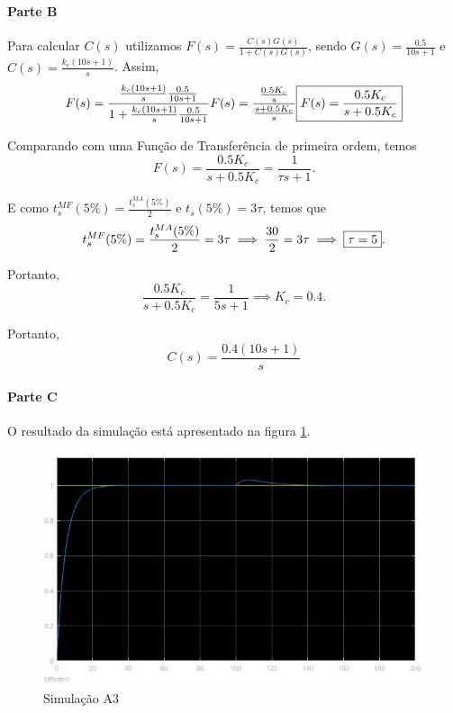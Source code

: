 \documentclass[
]{book}
\theoremstyle{definition}
\theoremstyle{definition}
\theoremstyle{definition}
\theoremstyle{remark}
\begin{document}
\hypertarget{parte-b-5}{%
\paragraph{Parte B}\label{parte-b-5}}

Para calcular \(C(s)\) utilizamos \(F(s) = \frac{C(s)G(s)}{1+C(s)G(s)}\), sendo \(G(s) = \frac{0.5}{10s+1}\) e \(C(s) = \frac{k_c(10s+1)}{s}\). Assim,
\[
F(s) = \frac{\frac{k_c(10s+1)}{s}\frac{0.5}{10s+1}}{1+\frac{k_c(10s+1)}{s}\frac{0.5}{10s+1}} \\
F(s) = \frac{\frac{0.5K_c}{s}}{\frac{s+0.5K_c}{s}}\\
\boxed{F(s) = \frac{0.5K_c}{s+0.5K_c}}
\]

Comparando com uma Função de Transferência de primeira ordem, temos
\[
F(s) = \frac{0.5K_c}{s+0.5K_c} = \frac{1}{\tau s+1}.
\]

E como \(t_s^{MF}(5\%) = \frac{t_s^{MA}(5\%)}{2}\) e \(t_s(5\%) = 3\tau\), temos que
\[
t_s^{MF}(5\%) = \frac{t_s^{MA}(5\%)}{2} = 3\tau \\
\implies \frac{30}{2}=3\tau \\
\implies \boxed{\tau = 5}.
\]

Portanto,
\[
\frac{0.5K_c}{s+0.5K_c}=\frac{1}{5s+1}
\implies \boxed{K_c = 0.4}.
\]

Portanto,
\[
C(s) = \frac{0.4(10s+1)}{s}
\]

\hypertarget{parte-c-3}{%
\paragraph{Parte C}\label{parte-c-3}}

O resultado da simulação está apresentado na figura \ref{fig:prob1C1}.

\begin{figure}

{\centering \includegraphics[width=0.8\linewidth]{Imagens/Lab5/Resolução/prob1C1} 

}

\caption{Simulação A3}\label{fig:prob1C1}
\end{figure}
\end{document}
